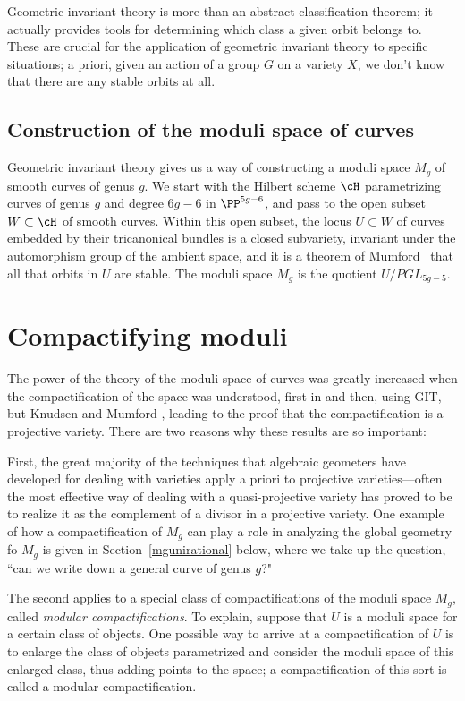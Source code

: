 Geometric invariant theory is more than an abstract classification theorem; it actually provides tools for determining which class a given orbit belongs to. These are crucial for the application of geometric invariant theory to specific situations; a  priori, given an action of a group $G$ on a variety $X$, we don't know that there are any stable orbits at all.

\subsection{Construction of the moduli space of curves}

Geometric invariant theory gives us a way of constructing a moduli space $M_g$ of smooth  curves of genus $g$. We start with the Hilbert scheme $\cH$ parametrizing curves of genus $g$ and degree $6g-6$ in $\PP^{5g-6}$, and pass to the open subset $W \subset \cH$ of smooth curves. Within this open subset, the locus $U \subset W$ of curves embedded by their tricanonical bundles is a closed subvariety, invariant under the automorphism group of the ambient space, and it is a theorem of Mumford~\cite{MumfordGIT} that all that orbits in $U$ are stable. The moduli space $M_g$ is the quotient $U/PGL_{5g-5}$.

\section{Compactifying moduli}

The power of the theory of the moduli space of curves was greatly increased when the compactification of the space was understood, first in \cite{DeligneMumford} and then, using GIT, but Knudsen and Mumford \cite{***}, leading to the proof that the compactification is a projective variety. There are two reasons why these results are so important:

First, the great majority of the techniques that algebraic geometers have developed for dealing with varieties apply a priori to projective varieties---often the most effective way of dealing with a quasi-projective variety has proved to be to realize it as the complement of a divisor in a projective variety. One example of how  a compactification of $M_g$ can play a role in analyzing the global geometry fo $M_g$ is given in Section~\ref{mgunirational} below, where we take up the question, ``can we write down a general curve of genus $g$?"

The second applies to a special class of compactifications of the moduli space $M_g$, called \emph{modular compactifications}. To explain, suppose that $U$ is a moduli space for a certain class of objects. One possible way to arrive at a compactification of $U$ is to enlarge the class of objects parametrized and consider the moduli space of this enlarged class, thus adding points to the space; a compactification of this sort  is called a modular compactification.

